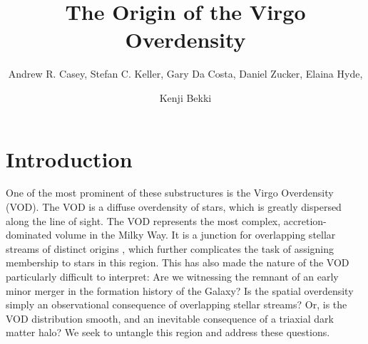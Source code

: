 \documentclass{emulateapj}
\begin{document}
\title{The Origin of the Virgo Overdensity}


\author{Andrew R. Casey, Stefan C. Keller, Gary Da Costa, Daniel Zucker, Elaina Hyde, \and Kenji Bekki}

\begin{abstract}
\end{abstract}


\section{Introduction}


 

One of the most prominent of these substructures is the Virgo Overdensity (VOD). The VOD is a diffuse overdensity of stars, which is greatly dispersed along the line of sight. The VOD represents the most complex, accretion-dominated volume in the Milky Way. It is a junction for overlapping stellar streams of distinct origins \citet{Belokurov;et-al_2006}, which further complicates the task of assigning membership to stars in this region. This has also made the nature of the VOD particularly difficult to interpret: Are we witnessing the remnant of an early minor merger in the formation history of the Galaxy? Is the spatial overdensity simply an observational consequence of overlapping stellar streams? Or, is the VOD distribution smooth, and an inevitable consequence of a triaxial dark matter halo? We seek to untangle this region and address these questions.
\end{document}
